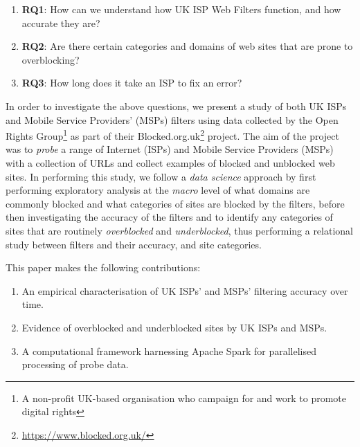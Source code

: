 \documentclass{bmcart}
\begin{document}
\begin{enumerate}
	\item \textbf{RQ1}: How can we understand how UK ISP Web Filters function, and how accurate they are?
	\item \textbf{RQ2}: Are there certain categories and domains of web sites that are prone to overblocking?
	\item \textbf{RQ3}: How long does it take an ISP to fix an error?
\end{enumerate}

In order to investigate the above questions, we present a study of both UK ISPs and Mobile Service Providers' (MSPs) filters using data collected by the Open Rights Group\footnote{A non-profit UK-based organisation who campaign for and work to promote digital rights} as part of their Blocked.org.uk\footnote{\url{https://www.blocked.org.uk/}} project.
The aim of the project was to \textit{probe} a range of Internet (ISPs) and Mobile Service Providers (MSPs) with a collection of URLs and collect examples of blocked and unblocked web sites.
In performing this study, we follow a \textit{data science} approach by first performing exploratory analysis at the \textit{macro} level of what domains are commonly blocked and what categories of sites are blocked by the filters, before then investigating the accuracy of the filters and to identify any categories of sites that are routinely \textit{overblocked} and \textit{underblocked}, thus performing a relational study between filters and their accuracy, and site categories.

This paper makes the following contributions:
\begin{enumerate}
	\item An empirical characterisation of UK ISPs' and MSPs' filtering accuracy over time.
	\item Evidence of overblocked and underblocked sites by UK ISPs and MSPs.
	\item A computational framework harnessing Apache Spark for parallelised processing of probe data.
\end{enumerate}
\end{document}
